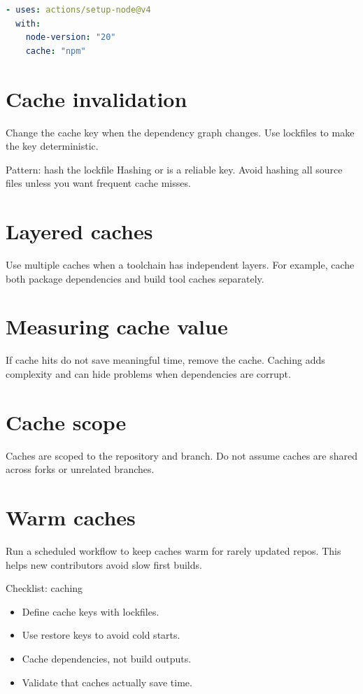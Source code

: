 \begin{lstlisting}[language=YAML]
- uses: actions/setup-node@v4
  with:
    node-version: "20"
    cache: "npm"
\end{lstlisting}

\section{Cache invalidation}
Change the cache key when the dependency graph changes.
Use lockfiles to make the key deterministic.

\begin{patternbox}{Pattern: hash the lockfile}
Hashing  or  is a reliable key.
Avoid hashing all source files unless you want frequent cache misses.
\end{patternbox}

\section{Layered caches}
Use multiple caches when a toolchain has independent layers.
For example, cache both package dependencies and build tool caches separately.

\section{Measuring cache value}
If cache hits do not save meaningful time, remove the cache.
Caching adds complexity and can hide problems when dependencies are corrupt.

\section{Cache scope}
Caches are scoped to the repository and branch.
Do not assume caches are shared across forks or unrelated branches.

\section{Warm caches}
Run a scheduled workflow to keep caches warm for rarely updated repos.
This helps new contributors avoid slow first builds.

\begin{checklistbox}{Checklist: caching}
\begin{itemize}[nosep]
  \item Define cache keys with lockfiles.
  \item Use restore keys to avoid cold starts.
  \item Cache dependencies, not build outputs.
  \item Validate that caches actually save time.
\end{itemize}
\end{checklistbox}
